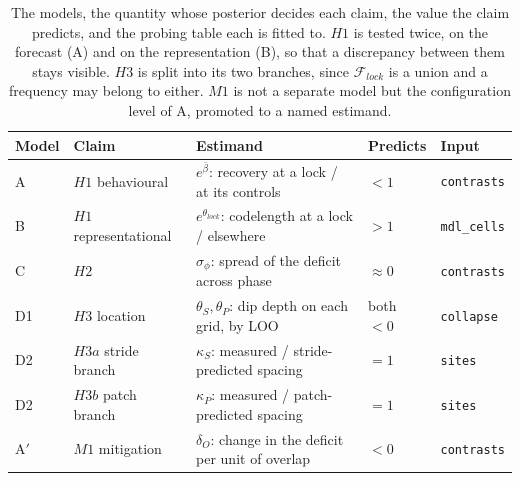 \begin{table}[!t]
    \centering
    \small
    \begin{tabular}{@{}lllll@{}}
        \toprule
        \textbf{Model} & \textbf{Claim} & \textbf{Estimand} & \textbf{Predicts} & \textbf{Input} \\
        \midrule
        A  & $H1$ behavioural      & $e^{\bar\beta}$: recovery at a lock / at its controls   & $<1$        & \texttt{contrasts} \\
        B  & $H1$ representational & $e^{\theta_{lock}}$: codelength at a lock / elsewhere   & $>1$        & \texttt{mdl\_cells} \\
        C  & $H2$                  & $\sigma_\phi$: spread of the deficit across phase       & $\approx 0$ & \texttt{contrasts} \\
        D1 & $H3$ location         & $\theta_S,\theta_P$: dip depth on each grid, by LOO     & both $<0$   & \texttt{collapse} \\
        D2 & $H3a$ stride branch   & $\kappa_S$: measured / stride-predicted spacing         & $=1$        & \texttt{sites} \\
        D2 & $H3b$ patch branch    & $\kappa_P$: measured / patch-predicted spacing          & $=1$        & \texttt{sites} \\
        A$'$ & $M1$ mitigation     & $\delta_O$: change in the deficit per unit of overlap   & $<0$        & \texttt{contrasts} \\
        \bottomrule
    \end{tabular}
    \caption{The models, the quantity whose posterior decides each claim, the value the claim predicts, and the probing table each is fitted to. $H1$ is tested twice, on the forecast (A) and on the representation (B), so that a discrepancy between them stays visible. $H3$ is split into its two branches, since $\mathcal F_{lock}$ is a union and a frequency may belong to either. $M1$ is not a separate model but the configuration level of A, promoted to a named estimand.}
    \label{tab:bayesModels}
\end{table}
